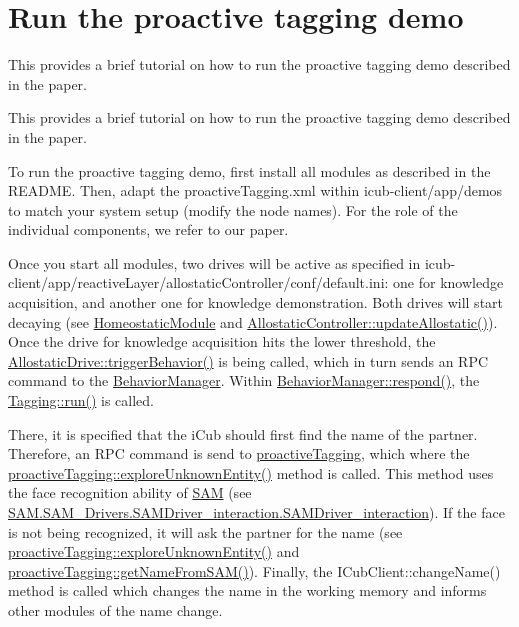 \hypertarget{group__icubclient__tagging}{}\section{Run the proactive tagging demo}
\label{group__icubclient__tagging}


This provides a brief tutorial on how to run the proactive tagging demo described in the paper.  


This provides a brief tutorial on how to run the proactive tagging demo described in the paper. 

To run the proactive tagging demo, first install all modules as described in the R\+E\+A\+D\+ME. Then, adapt the {\ttfamily proactive\+Tagging.\+xml} within {\ttfamily icub-\/client/app/demos} to match your system setup (modify the node names). For the role of the individual components, we refer to our paper.

Once you start all modules, two drives will be active as specified in {\ttfamily icub-\/client/app/reactive\+Layer/allostatic\+Controller/conf/default.\+ini}\+: one for knowledge acquisition, and another one for knowledge demonstration. Both drives will start decaying (see \hyperlink{group__homeostasis_classHomeostaticModule}{Homeostatic\+Module} and \hyperlink{group__allostaticController_a448eb3497467e10577e6a03ef55633f3}{Allostatic\+Controller\+::update\+Allostatic()}). Once the drive for knowledge acquisition hits the lower threshold, the \hyperlink{group__allostaticController_a70e9a461682da34e29e77d5d85d5a11c}{Allostatic\+Drive\+::trigger\+Behavior()} is being called, which in turn sends an R\+PC command to the \hyperlink{group__behaviorManager_classBehaviorManager}{Behavior\+Manager}. Within \hyperlink{group__behaviorManager_a79cbdf143299a44a1c391e385846bb04}{Behavior\+Manager\+::respond()}, the \hyperlink{group__behaviorManager_a8427d7f479b580bbf54030015b506374}{Tagging\+::run()} is called.

There, it is specified that the i\+Cub should first find the name of the partner. Therefore, an R\+PC command is send to \hyperlink{classproactiveTagging}{proactive\+Tagging}, which where the \hyperlink{classproactiveTagging_a7645a181289f171fc5268ecd24e7ace9}{proactive\+Tagging\+::explore\+Unknown\+Entity()} method is called. This method uses the face recognition ability of \hyperlink{namespaceSAM}{S\+AM} (see \hyperlink{group__icubclient__SAM__Drivers_classSAM_1_1SAM__Drivers_1_1SAMDriver__interaction_1_1SAMDriver__interaction}{S\+A\+M.\+S\+A\+M\+\_\+\+Drivers.\+S\+A\+M\+Driver\+\_\+interaction.\+S\+A\+M\+Driver\+\_\+interaction}). If the face is not being recognized, it will ask the partner for the name (see \hyperlink{classproactiveTagging_a7645a181289f171fc5268ecd24e7ace9}{proactive\+Tagging\+::explore\+Unknown\+Entity()} and \hyperlink{classproactiveTagging_a7d77039a8eb90ea145043d28a2b5435c}{proactive\+Tagging\+::get\+Name\+From\+S\+A\+M()}). Finally, the I\+Cub\+Client\+::change\+Name() method is called which changes the name in the working memory and informs other modules of the name change.

